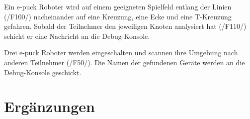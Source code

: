 \documentclass[10pt,a4paper]{article}
\let\oldsection\section
\renewcommand{\section}{\newpage \oldsection}
\begin{document}
				Ein e-puck Roboter wird auf einem geeigneten Spielfeld entlang der Linien (/F100/) nacheinander  auf eine 
				Kreuzung, 	eine Ecke und eine T-Kreuzung gefahren. Sobald der Teilnehmer den jeweiligen Knoten analysiert
				hat (/F110/) schickt er eine Nachricht an die Debug-Konsole.			
			
			
				Drei e-puck Roboter werden eingeschalten und scannen ihre
				Umgebung nach anderen Teilnehmer (/F50/). Die Namen der gefundenen
				Geräte werden an die Debug-Konsole geschickt.
				

	\section{Ergänzungen}
						
\end{document}
